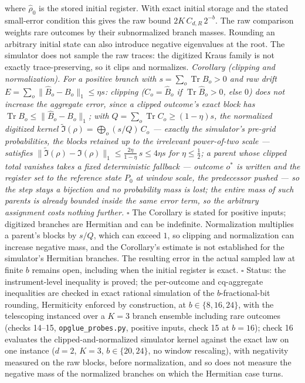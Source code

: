 \documentclass[
]{article}
\begin{document}
where \(\widehat\rho_0\) is the stored initial register. With exact
initial storage and the stated small-error condition this gives the raw
bound \(2K\, C_{d,R}\,2^{-b}\). The raw comparison weights rare outcomes
by their subnormalized branch masses. Rounding an arbitrary initial
state can also introduce negative eigenvalues at the root. The simulator
does not sample the raw traces: the digitized Kraus family is not
exactly trace-preserving, so it clips and normalizes. \emph{Corollary
(clipping and normalization).} \emph{For a positive branch with
\(s = \sum_o \operatorname{Tr} B_o > 0\) and raw drift
\(E = \sum_o \|\widehat B_o - B_o\|_1 \leq \eta s\): clipping
(\(C_o = \widehat B_o\) if \(\operatorname{Tr}\widehat B_o > 0\), else
\(0\)) does not increase the aggregate error, since a clipped outcome's
exact block has \(\operatorname{Tr} B_o \leq \|\widehat B_o - B_o\|_1\);
with \(Q = \sum_o \operatorname{Tr} C_o \geq (1{-}\eta)s\), the
normalized digitized kernel
\(\widetilde{\mathfrak I}(\rho) = \bigoplus_o (s/Q)\, C_o\) --- exactly
the simulator's pre-grid probabilities, the blocks retained up to the
irrelevant power-of-two scale --- satisfies
\(\|\widetilde{\mathfrak I}(\rho) - \mathfrak I(\rho)\|_1 \leq \tfrac{2\eta}{1-\eta}\, s \leq 4\eta s\)
for \(\eta \leq \tfrac12\); a parent whose clipped total vanishes takes
a fixed deterministic fallback --- outcome \(o^\ast\) is written and the
register set to the reference state \(P_0\) at window scale, the
predecessor pushed --- so the step stays a bijection and no probability
mass is lost; the entire mass of such parents is already bounded inside
the same error term, so the arbitrary assignment costs nothing further.}
\(\square\) The Corollary is stated for positive inputs; digitized
branches are Hermitian and can be indefinite. Normalization multiplies a
parent's blocks by \(s/Q\), which can exceed \(1\), so clipping and
normalization can increase negative mass, and the Corollary's estimate
is not established for the simulator's Hermitian branches. The resulting
error in the actual sampled law at finite \(b\) remains open, including
when the initial register is exact. \(\square\) Status: the
instrument-level inequality is proved; the per-outcome and cq-aggregate
inequalities are checked in exact rational simulation of the
\(b\)-fractional-bit rounding, Hermiticity enforced by construction, at
\(b \in \{8, 16, 24\}\), with the telescoping instanced over a \(K{=}3\)
branch ensemble including rare outcomes (checks 14--15,
\texttt{opglue\_probes.py}, positive inputs, check 15 at \(b = 16\));
check 16 evaluates the clipped-and-normalized simulator kernel against
the exact law on one instance (\(d = 2\), \(K = 3\),
\(b \in \{20, 24\}\), no window rescaling), with negativity measured on
the raw blocks, before normalization, and so does not measure the
negative mass of the normalized branches on which the Hermitian case
turns.
\end{document}
